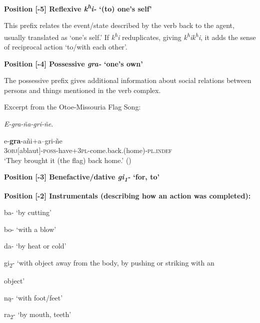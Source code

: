 \documentclass[output=paper]{LSP/langsci}
\begin{document}
\vspace{1em}
\textbf{Position [-5]  Reflexive \textit{k\textsuperscript{h}i-}  `(to) one's self'}		
				     		     	       
This prefix relates the event/state described by the verb back to the agent, usually translated as `one's self.' If \textit{k\textsuperscript{h}i} reduplicates, giving \textit{k\textsuperscript{h}ik\textsuperscript{h}i}, it adds the sense of reciprocal action `to/with each other'.  

\vspace{1em}
\textbf{Position [-4] Possessive  \textit{gra-}  `one's own'}	
						      
The possessive prefix gives additional information about social relations between persons and things mentioned in the verb complex.				
\begin{exe}
\ex	Excerpt from the Otoe-Missouria Flag Song:  	
						           
\textit{E-gra-\~na-gri-\~ne}.

\gll e-\textbf{gra}-a\~ni+a--gri-\~ne \\		     
3\textsc{obj}[ablaut]-\textsc{poss}-have+3\textsc{pl}-come.back.(home)-\textsc{pl.indef} \\
\trans `They brought it (the flag) back home.' (\citealt{Greer2008})	 
\end{exe}

\textbf{Position [-3]  Benefactive/dative \textit{gi\textsubscript{1}-} `for, to'}    					         

\vspace{1em}
\textbf{Position [-2]  Instrumentals (describing how an action was completed):}					

\hspace{2em} ba- `by cutting' 
			
\hspace{2em} bo- `with a blow'      	

\hspace{2em} da- `by heat or cold' 	

\hspace{2em} gi\textsubscript{2}- `with object away from the body, by pushing or striking with an 

\hspace{3em} object' 			

\hspace{2em} n\k{a}- `with foot/feet'		

\hspace{2em} ra\textsubscript{2}- `by mouth, teeth'				
\end{document}
